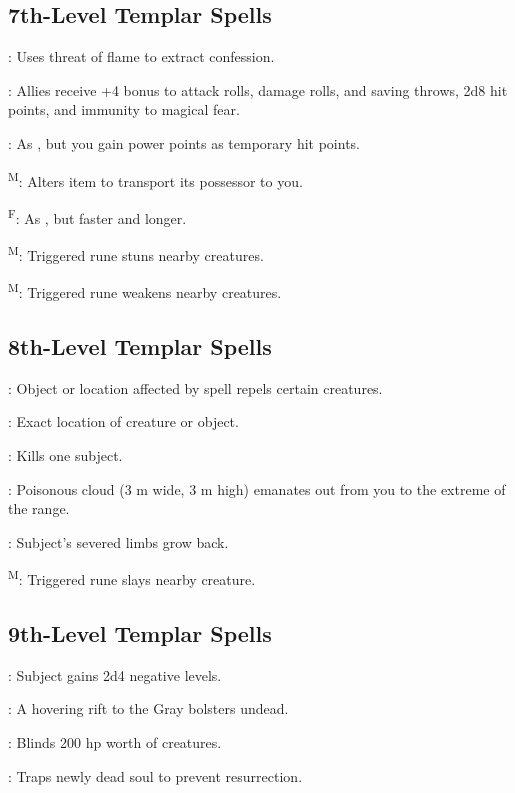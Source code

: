 \subsection{7th-Level Templar Spells}

: Uses threat of flame to extract confession.

: Allies receive +4 bonus to attack rolls, damage rolls, and saving throws, 2d8 hit points, and immunity to magical fear.

: As , but you gain power points as temporary hit points.

\textsuperscript{M}: Alters item to transport its possessor to you.

\textsuperscript{F}: As , but faster and longer.

\textsuperscript{M}: Triggered rune stuns nearby creatures.

\textsuperscript{M}: Triggered rune weakens nearby creatures.



\subsection{8th-Level Templar Spells}

: Object or location affected by spell repels certain creatures.

: Exact location of creature or object.

: Kills one subject.

: Poisonous cloud (3 m wide, 3 m high) emanates out from you to the extreme of the range.

: Subject's severed limbs grow back.

\textsuperscript{M}: Triggered rune slays nearby creature.



\subsection{9th-Level Templar Spells}

: Subject gains 2d4 negative levels.

: A hovering rift to the Gray bolsters
undead.

: Blinds 200 hp worth of creatures.

: Traps newly dead soul to prevent
resurrection.